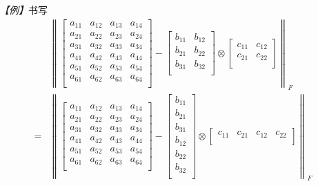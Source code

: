 \emph{【例】}书写
\begin{equation}
    \begin{aligned}
          & \left\|\left[\begin{array}{cc|cc} a_{11} & a_{12} & a_{13} & a_{14} \\ a_{21} & a_{22} & a_{23} & a_{24} \\ \hline a_{31} & a_{32} & a_{33} & a_{34} \\ a_{41} & a_{42} & a_{43} & a_{44} \\ \hline a_{51} & a_{52} & a_{53} & a_{54} \\ a_{61} & a_{62} & a_{63} & a_{64} \\ \end{array}\right]-\left[\begin{array}{cc} b_{11} & b_{12} \\ b_{21} & b_{22} \\ b_{31} & b_{32} \\ \end{array}\right]\otimes\left[\begin{array}{cc} c_{11} & c_{12} \\ c_{21} & c_{22} \\ \end{array}\right]\right\|_{F} \\
        = & \left\|\left[\begin{array}{cc|cc} a_{11} & a_{12} & a_{13} & a_{14} \\ a_{21} & a_{22} & a_{23} & a_{24} \\ \hline a_{31} & a_{32} & a_{33} & a_{34} \\ a_{41} & a_{42} & a_{43} & a_{44} \\ \hline a_{51} & a_{52} & a_{53} & a_{54} \\ a_{61} & a_{62} & a_{63} & a_{64} \\ \end{array}\right]-\left[\begin{array}{c} b_{11} \\ b_{21} \\ b_{31} \\ b_{12} \\ b_{22} \\ b_{32} \\ \end{array}\right]\otimes\left[\begin{array}{cccc} c_{11} & c_{21} & c_{12} & c_{22} \\ \end{array}\right]\right\|_{F}
    \end{aligned}
\end{equation}
